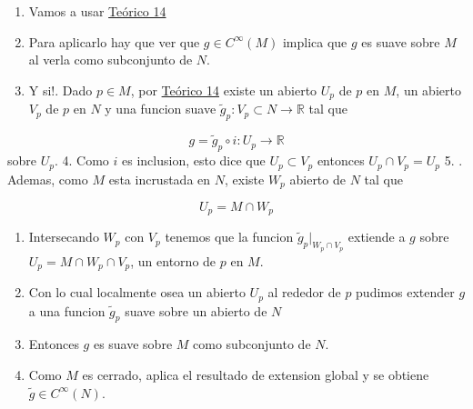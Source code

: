 \begin{bookproof}{}
\begin{enumerate}
\item Vamos a usar \hyperref[blk:81237c]{Teórico 14}
\item Para aplicarlo hay que ver que $g \in C^\infty(M)$ implica que $g$ es suave sobre $M$ al verla como subconjunto de $N$.
\item Y si!. Dado $p \in M$, por \hyperref[blk:f11484]{Teórico 14} existe un abierto $U_p$ de $p$ en $M$, un abierto $V_p$ de $p$ en $N$ y una funcion suave $\widetilde g_p:V_p \subset N \to \mathbb R$ tal que
\end{enumerate}
\[
g=\widetilde g_p \circ i:U_{p}\rightarrow \mathbb{R}
\]
sobre $U_p$. 4. Como $i$ es inclusion, esto dice que $U_p \subset V_p$ entonces $U_{p}\cap V_{p}=U_{p}$ 5. . Ademas, como $M$ esta incrustada en $N$, existe $W_p$ abierto de $N$ tal que

\[
U_p=M \cap W_p
\]
\begin{enumerate}[start=6]
\item Intersecando $W_{p}$ con $V_p$ tenemos que la funcion $\widetilde g_p|_{W_{p}\cap V_{p}}$ extiende a $g$ sobre $U_{p}=M\cap W_{p}\cap V_{p}$, un entorno de $p$ en $M$.
\item Con lo cual localmente osea un abierto $U_{p}$ al rededor de $p$ pudimos extender $g$ a una funcion $\tilde{g}_{p}$ suave sobre un abierto de $N$
\item Entonces $g$ es suave sobre $M$ como subconjunto de $N$.
\item Como $M$ es cerrado, aplica el resultado de extension global y se obtiene $\widetilde g \in C^\infty(N)$.
\end{enumerate}
\bookqed
\end{bookproof}
